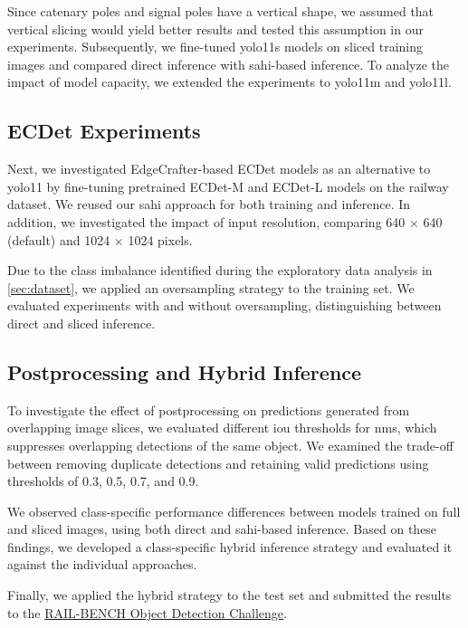 Since catenary poles and signal poles have a vertical shape, we assumed that vertical slicing  would yield better results and tested this assumption in our experiments. 
Subsequently, we fine-tuned \acrshort{yolo}11s models on sliced training images and compared direct inference with \acrshort{sahi}-based inference. To analyze the impact of model capacity, we extended the experiments to \acrshort{yolo}11m and \acrshort{yolo}11l.

\subsection{ECDet Experiments}

Next, we investigated EdgeCrafter-based ECDet models as an alternative to \acrshort{yolo}11 by fine-tuning pretrained ECDet-M and ECDet-L models on the railway dataset. We reused our \acrshort{sahi} approach for both training and inference. In addition, we investigated the impact of input resolution, comparing 640 $\times$ 640 (default) and 1024 $\times$ 1024 pixels.

Due to the class imbalance identified during the exploratory data analysis in \cref{sec:dataset}, we applied an oversampling strategy to the training set. We evaluated experiments with and without oversampling, distinguishing between direct and sliced inference.

\subsection{Postprocessing and Hybrid Inference}

To investigate the effect of postprocessing on predictions generated from overlapping image slices, we evaluated different \acrshort{iou} thresholds for \acrfull{nms}, which suppresses overlapping detections of the same object. We examined the trade-off between removing duplicate detections and retaining valid predictions using thresholds of 0.3, 0.5, 0.7, and 0.9.

We observed class-specific performance differences between models trained on full and sliced images, using both direct and \acrshort{sahi}-based inference. Based on these findings, we developed a class-specific hybrid inference strategy and evaluated it against the individual approaches.

Finally, we applied the hybrid strategy to the test set and submitted the results to the
\href{https://www.codabench.org/competitions/15442/}
{RAIL-BENCH Object Detection Challenge}.





